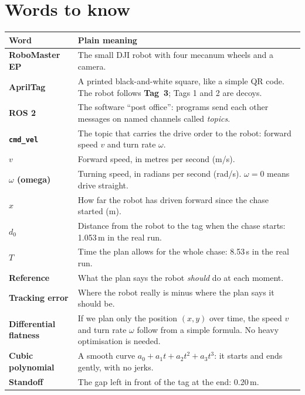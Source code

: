 \documentclass[11pt,a4paper]{article}
\begin{document}
\section{Words to know}
\begin{center}\small
\begin{tabularx}{\linewidth}{@{}>{\bfseries}p{3.6cm}X@{}}
\toprule
\textnormal{\textbf{Word}} & \textbf{Plain meaning}\\
\midrule
RoboMaster EP & The small DJI robot with four mecanum wheels and a camera.\\
AprilTag & A printed black-and-white square, like a simple QR code. The robot follows \textbf{Tag~3}; Tags 1 and 2 are decoys.\\
ROS 2 & The software ``post office'': programs send each other messages on named channels called \emph{topics}.\\
\texttt{cmd\_vel} & The topic that carries the drive order to the robot: forward speed $v$ and turn rate $\omega$.\\
$v$ & Forward speed, in metres per second (m/s).\\
$\omega$ (omega) & Turning speed, in radians per second (rad/s). $\omega=0$ means drive straight.\\
$x$ & How far the robot has driven forward since the chase started (m).\\
$d_0$ & Distance from the robot to the tag when the chase starts: 1.053\,m in the real run.\\
$T$ & Time the plan allows for the whole chase: 8.53\,s in the real run.\\
Reference & What the plan says the robot \emph{should} do at each moment.\\
Tracking error & Where the robot really is minus where the plan says it should be.\\
Differential flatness & If we plan only the position $(x,y)$ over time, the speed $v$ and turn rate $\omega$ follow from a simple formula. No heavy optimisation is needed.\\
Cubic polynomial & A smooth curve $a_0+a_1t+a_2t^2+a_3t^3$: it starts and ends gently, with no jerks.\\
Standoff & The gap left in front of the tag at the end: 0.20\,m.\\
\bottomrule
\end{tabularx}
\end{center}

\end{document}
